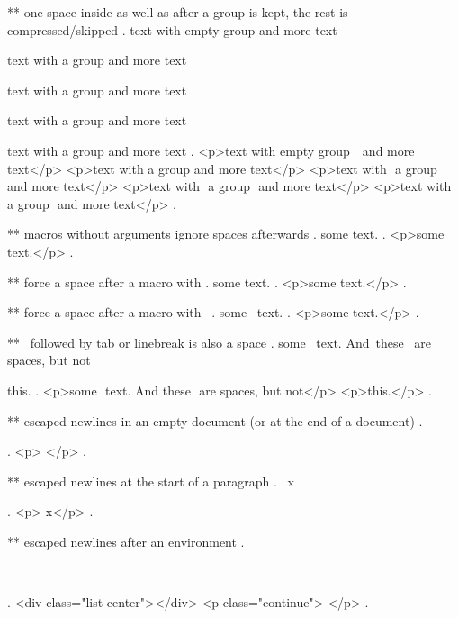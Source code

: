 ** one space inside as well as after a group is kept, the rest is compressed/skipped
.
text with empty group {  } and more text

text with {a group} and more text

text with { a group } and more text

text with { a group  } and more text

text with {  a group  }  and more text
.
<p>text with empty group ​ ​ and more text</p>
<p>text with a group​ and more text</p>
<p>text with ​ a group ​ and more text</p>
<p>text with ​ a group ​ and more text</p>
<p>text with ​ a group ​ and more text</p>
.


** macros without arguments ignore spaces afterwards
.
some \echo  text.
.
<p>some text.</p>
.


** force a space after a macro with {}
.
some \echo{} text.
.
<p>some ​ text.</p>
.


** force a space after a macro with \
.
some \echo\ text.
.
<p>some ​ text.</p>
.


** \ followed by tab or linebreak is also a space
.
some \echo\
text. And\	these
\
are spaces, but not\

this.
.
<p>some ​ text. And​ these ​ are spaces, but not​ </p>
<p>this.</p>
.


** escaped newlines in an empty document (or at the end of a document)
.
\


.
<p>​ </p>
.


** escaped newlines at the start of a paragraph
.
\
x

.
<p>​ x</p>
.


** escaped newlines after an environment
.
\begin{center}
\end{center}
\

.
<div class="list center"></div>
<p class="continue">​ </p>
.
